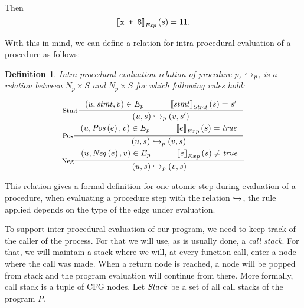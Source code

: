 \documentclass[..thesis.tex]{subfiles}
\newtheorem{defin}{Definition}[section]
\begin{document}
Then 
\begin{equation*}
\left\llbracket \text{\texttt{x + 8}} \right\rrbracket_{\mathit{Exp}} \left( s \right) = 11 \text{.}    
\end{equation*}

With this in mind, we can define a relation for intra-procedural evaluation of a procedure as follows:

\begin{defin}
Intra-procedural evaluation relation of procedure $p$, $\hookrightarrow_p$,
is a relation between $N_p \times S$ and $N_p \times S$ for which following rules hold:

\addtolength{\jot}{2em}
\begin{gather*}
  \inference[Stmt]{ \lp u, \mathword{stmt}, v \rp \in E_{p}  \separ  \lllb \mathword{stmt} \rrrb_{\mathword{Stmt}} \lp s \rp = s'}{\lp u, s \rp \intraproc_p \lp v, s' \rp} \\
  \inference[Pos]{ \lp u, \mathword{Pos} \lp e \rp , v \rp \in E_{p} \separ \lllb e \rrrb_{Exp} \lp s \rp = \mathword{true} }{\lp u, s \rp \intraproc_p \lp v, s \rp} \\  
  \inference[Neg]{ \lp u, \mathword{Neg} \lp e \rp , v \rp \in E_{p} \separ \lllb e \rrrb_{Exp} \lp s \rp \neq \mathword{true} }{\lp u, s \rp \intraproc_p \lp v, s \rp} 
\end{gather*}
\addtolength{\jot}{-2em}

\end{defin}


This relation gives a formal definition for one atomic step during evaluation of a procedure, when evaluating a procedure step with the relation $\hookrightarrow$,
the rule applied depends on the type of the edge under evaluation. 


To support inter-procedural evaluation of our program, we need to keep track of the caller of the process. For that we will use, as is usually done, a \textit{call stack}.
For that, we will maintain a stack where we will, at every function call, enter a node where the call was made. When a return node is reached,
a node will be popped from stack and the program evaluation will continue from there.
More formally, call stack is a tuple of CFG nodes. Let $\mathit{Stack}$ be a set of all call stacks of the program $P$. 
\end{document}

